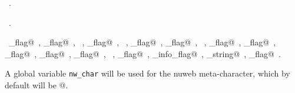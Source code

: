 \documentclass[a4paper]{report}
\begin{document}
\begin{flushleft}
\begin{minipage}{\linewidth}
\begin{list}{}{\setlength{\itemsep}{-\parsep}\setlength{\itemindent}{-\leftmargin}}
\item \NWtxtMacroDefBy\ .
\item \NWtxtMacroRefIn\ .
\item \NWtxtIdentsUsed\nobreak\  \verb@compare_flag@\nobreak\ , \verb@dangling_flag@\nobreak\ , \verb@FALSE@\nobreak\ , \verb@html_flag@\nobreak\ , \verb@hyperoptions@\nobreak\ , \verb@hyperopt_flag@\nobreak\ , \verb@hyperref_flag@\nobreak\ , \verb@incl@\nobreak\ , \verb@includepath_flag@\nobreak\ , \verb@number_flag@\nobreak\ , \verb@output_flag@\nobreak\ , \verb@scrap_flag@\nobreak\ , \verb@tex_flag@\nobreak\ , \verb@TRUE@\nobreak\ , \verb@verbose_flag@\nobreak\ , \verb@version_info_flag@\nobreak\ , \verb@version_string@\nobreak\ , \verb@xref_flag@\nobreak\ .
\item{}
\end{list}
\end{minipage}\vspace{4ex}
\end{flushleft}
A global variable \verb|nw_char| will be used for the nuweb
meta-character, which by default will be @.
\end{document}

